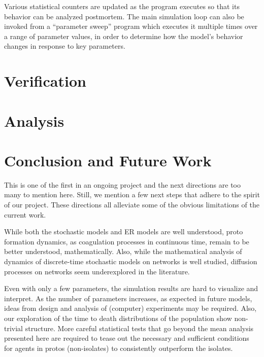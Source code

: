 \documentclass[sigconf]{acmart}
\begin{document}
Various statistical counters are updated as the program executes so that its behavior can be analyzed postmortem. The main simulation loop can also be invoked from a ``parameter sweep'' program which executes it multiple times over a range of parameter values, in order to determine how the model's behavior changes in response to key parameters.



\section{Verification}


\section{Analysis}

\section{Conclusion and Future Work}
This is one of the first in an ongoing project and the next directions are too many to mention here. Still, we mention a few next steps that adhere to the spirit of our project. These directions all alleviate some of the obvious limitations of the current work. 

While both the stochastic models and ER models are well understood, proto formation dynamics, as coagulation processes in continuous time, remain to be better understood, mathematically. Also, while the mathematical analysis of dynamics of discrete-time stochastic models on networks is well studied, diffusion processes on networks seem underexplored in the literature. 

Even with only a few parameters, the simulation results are hard to visualize and interpret. As the number of parameters increases, as expected in future models, ideas from design and analysis of (computer) experiments may be required. Also, our exploration of the time to death distributions of the population show non-trivial structure. More careful statistical tests that go beyond the mean analysis presented here are required to tease out the necessary and sufficient conditions for agents in protos (non-isolates) to consistently outperform the isolates.   
\end{document}

